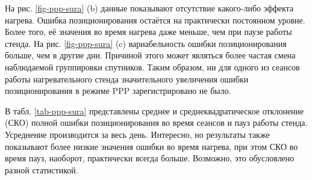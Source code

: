 На рис. \ref{fig-ppp-sura} (b) данные показывают отсутствие какого-либо эффекта нагрева.
Ошибка позиционирования остаётся на практически постоянном уровне.
Более того, её значения во время нагрева даже меньше, чем при паузе работы стенда. 
На рис. \ref{fig-ppp-sura} (c) вариабельность ошибки позиционирования больше, чем в другие дни.
Причиной этого может являться более частая смена наблюдаемой группировки спутников.
Таким образом, ни для одного из сеансов работы нагревательного стенда значительного увеличения ошибки позиционирования в режиме PPP зарегистрировано не было.

В табл. \ref{tab-ppp-sura} представлены среднее и среднеквадратическое отклонение (СКО) полной ошибки позиционирования во время сеансов и пауз работы стенда. 
Усреднение производится за весь день.
Интересно, но результаты также показывают более низкие значения ошибки во время нагрева, при этом СКО во время пауз, наоборот, практически всегда больше.
Возможно, это обусловлено разной статистикой. 
\begingroup
